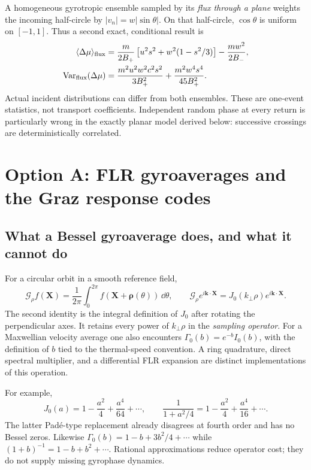 \documentclass[10pt,a4paper]{article}
\newcommand{\X}{\mathbf X}\newcommand{\n}{\mathbf n}
\newcommand{\avg}[1]{\langle #1\rangle}
\begin{document}
A homogeneous gyrotropic ensemble sampled by its \emph{flux through a plane} weights the incoming half-circle by $|v_n|=w|\sin\theta|$. On that half-circle, $\cos\theta$ is uniform on $[-1,1]$. Thus a second exact, conditional result is
\begin{align}\label{eq:fluxstats}
 \avg{\Delta\mu}_{\rm flux}
 &=\frac{m}{2B_+}\left[u^2s^2+w^2(1-s^2/3)\right]-\frac{mw^2}{2B_-},\\
 \operatorname{Var}_{\rm flux}(\Delta\mu)
 &=\frac{m^2u^2w^2c^2s^2}{3B_+^2}
       +\frac{m^2w^4s^4}{45B_+^2}.
\end{align}
Actual incident distributions can differ from both ensembles. These are one-event statistics, not transport coefficients. Independent random phase at every return is particularly wrong in the exactly planar model derived below: successive crossings are deterministically correlated.

\section{Option A: FLR gyroaverages and the Graz response codes}
\subsection{What a Bessel gyroaverage does, and what it cannot do}
For a circular orbit in a smooth reference field,
\begin{equation}\label{eq:gyroavg}
 \mathcal G_\rho f(\X)=\frac{1}{2\pi}\int_0^{2\pi}f(\X+\boldsymbol\rho(\theta))\,\dd\theta,
 \qquad \mathcal G_\rho e^{i\mathbf k\cdot\X}
 =J_0(k_\perp\rho)e^{i\mathbf k\cdot\X}.
\end{equation}
The second identity is the integral definition of $J_0$ after rotating the perpendicular axes. It retains every power of $k_\perp\rho$ in the \emph{sampling operator}. For a Maxwellian velocity average one also encounters $\Gamma_0(b)=e^{-b}I_0(b)$, with the definition of $b$ tied to the thermal-speed convention. A ring quadrature, direct spectral multiplier, and a differential FLR expansion are distinct implementations of this operation.

For example,
\begin{equation}
 J_0(a)=1-\frac{a^2}{4}+\frac{a^4}{64}+\cdots,
 \qquad \frac{1}{1+a^2/4}=1-\frac{a^2}{4}+\frac{a^4}{16}+\cdots.
\end{equation}
The latter Pad\'e-type replacement already disagrees at fourth order and has no Bessel zeros. Likewise $\Gamma_0(b)=1-b+3b^2/4+\cdots$ while $(1+b)^{-1}=1-b+b^2+\cdots$. Rational approximations reduce operator cost; they do not supply missing gyrophase dynamics.
\end{document}
